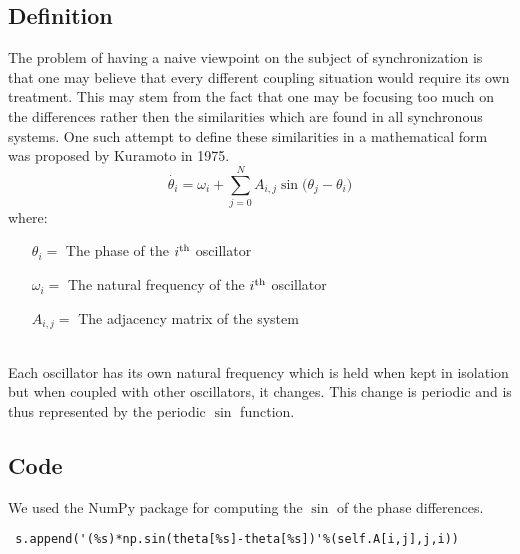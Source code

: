 \label{sec:kuramoto}
\subsection{Definition}
The problem of having a naive viewpoint on the subject of synchronization is that one may believe that every different coupling situation would require its own treatment. This may stem from the fact that one may be focusing too much on the differences rather then the similarities which are found in all synchronous systems. One such attempt to define these similarities in a mathematical form was proposed by Kuramoto in 1975.
\[
\dot{\theta_i} = \omega_i + \sum_{j = 0}^{N}{A_{i, j}\sin({\theta_j - \theta_i}}
)\]
where:
\begin{itemize}
	\item[${\theta_i} = $] The phase of the $i\textsuperscript{th}$ oscillator
	\item[$\omega_i = $] The natural frequency of the $i\textsuperscript{th}$ oscillator
	\item[$A_{i, j} = $] The adjacency matrix of the system
\end{itemize}
~\\
Each oscillator has its own natural frequency which is held when kept in isolation but when coupled with other oscillators, it changes. This change is periodic and is thus represented by the periodic $\sin$ function. 

\subsection{Code}
We used the NumPy package for computing the $\sin$ of the phase differences.
\\
\begin{lstlisting}
 s.append('(%s)*np.sin(theta[%s]-theta[%s])'%(self.A[i,j],j,i))
\end{lstlisting}


